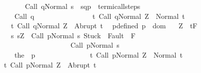 \begin{isabellebody}
\ \ \ \ \ \ \ \ \ \ \ \ \ \ \ \ \ \ \ \ {\isasymGamma}{\isasymturnstile}Call\ q{\isasymdown}Normal\ s\ {\isasymand}\ {\isacharparenleft}{\isacharparenleft}s{\isacharcomma}q{\isacharparenright}{\isacharcomma}{\isacharparenleft}{\isasymsigma}{\isacharcomma}p{\isacharparenright}{\isacharparenright}\ {\isasymin}\ termi{\isacharunderscore}call{\isacharunderscore}steps\ {\isasymGamma}{\isacharbraceright}\isanewline
\ \ \ \ \ \ \ \ \ \ \ \ \ \ \ \ \ {\isacharparenleft}Call\ q{\isacharparenright}\isanewline
\ \ \ \ \ \ \ \ \ \ \ \ \ \ \ \ {\isacharbraceleft}t{\isachardot}\ {\isasymGamma}{\isasymturnstile}{\isasymlangle}Call\ q{\isacharcomma}Normal\ Z{\isasymrangle}\ {\isasymRightarrow}\ Normal\ t{\isacharbraceright}{\isacharcomma}\isanewline
\ \ \ \ \ \ \ \ \ \ \ \ \ \ \ \ {\isacharbraceleft}t{\isachardot}\ {\isasymGamma}{\isasymturnstile}{\isasymlangle}Call\ q{\isacharcomma}Normal\ Z{\isasymrangle}\ {\isasymRightarrow}\ Abrupt\ t{\isacharbraceright}{\isachardoublequoteclose}\isanewline
\ \ p{\isacharunderscore}defined{\isacharcolon}\ {\isachardoublequoteopen}p\ {\isasymin}\ dom\ {\isasymGamma}{\isachardoublequoteclose}\isanewline
\ \ {\isachardoublequoteopen}{\isasymAnd}Z{\isachardot}\ {\isasymGamma}{\isacharcomma}{\isasymTheta}\ {\isasymturnstile}\isactrlsub t\isactrlbsub {\isacharslash}F\isactrlesub \ \ \isanewline
\ \ \ \ \ \ \ \ \ \ \ \ \ \ {\isacharparenleft}{\isacharbraceleft}{\isasymsigma}{\isacharbraceright}\ {\isasyminter}\ {\isacharbraceleft}s{\isachardot}\ s{\isacharequal}Z\ {\isasymand}\ {\isasymGamma}{\isasymturnstile}{\isasymlangle}Call\ p{\isacharcomma}Normal\ s{\isasymrangle}\ {\isasymRightarrow}{\isasymnotin}{\isacharparenleft}{\isacharbraceleft}Stuck{\isacharbraceright}\ {\isasymunion}\ Fault\ {\isacharbackquote}\ {\isacharparenleft}{\isacharminus}F{\isacharparenright}{\isacharparenright}\ {\isasymand}\ \ \isanewline
\ \ \ \ \ \ \ \ \ \ \ \ \ \ \ \ \ \ \ \ \ \ \ \ \ \ \ \ \ \ \ \ \ {\isasymGamma}{\isasymturnstile}Call\ p{\isasymdown}Normal\ s{\isacharbraceright}{\isacharparenright}\ \isanewline
\ \ \ \ \ \ \ \ \ \ \ \ \ \ \ \ \ the\ {\isacharparenleft}{\isasymGamma}\ p{\isacharparenright}\ \isanewline
\ \ \ \ \ \ \ \ \ \ \ \ \ \ {\isacharbraceleft}t{\isachardot}\ {\isasymGamma}{\isasymturnstile}{\isasymlangle}Call\ p{\isacharcomma}Normal\ Z{\isasymrangle}\ {\isasymRightarrow}\ Normal\ t{\isacharbraceright}{\isacharcomma}\isanewline
\ \ \ \ \ \ \ \ \ \ \ \ \ \ {\isacharbraceleft}t{\isachardot}\ {\isasymGamma}{\isasymturnstile}{\isasymlangle}Call\ p{\isacharcomma}Normal\ Z{\isasymrangle}\ {\isasymRightarrow}\ Abrupt\ t{\isacharbraceright}{\isachardoublequoteclose}\isanewline

\end{isabellebody}
